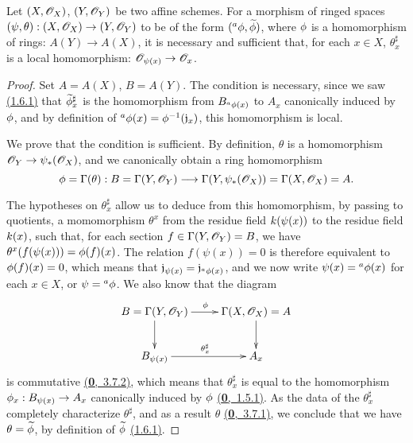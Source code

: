 \begin{thm}[1.7.3]
\label{thm-1.1.7.3}
Let $(X,\mathscr{O}_X)$, $(Y,\mathscr{O}_Y)$ be two affine schemes. For a morphism of ringed spaces
$(\psi,\theta):(X,\mathscr{O}_X)\to(Y,\mathscr{O}_Y)$ to be of the form $({}^a\phi,\widetilde{\phi})$,
where $\phi$ is a homomorphism of rings: $A(Y)\to A(X)$, it is necessary and sufficient
that, for each $x\in X$, $\theta_x^\sharp$ is a local homomorphism: $\mathscr{O}_{\psi(x)}\to\mathscr{O}_x$.
\end{thm}

\begin{proof}
\label{proof-thm-1.1.7.3}
Set $A=A(X)$, $B=A(Y)$. The condition is necessary, since we saw \hyperref[env-1.1.6.1]{(1.6.1)} that
$\widetilde{\phi}_x^\sharp$ is the homomorphism from $B_{{}^a\phi(x)}$ to $A_x$ canonically
induced by $\phi$, and by definition of ${}^a\phi(x)=\phi^{-1}(\mathfrak{j}_x)$, this
homomorphism is local.

We prove that the condition is sufficient. By definition, $\theta$ is a homomorphism
$\mathscr{O}_Y\to\psi_*(\mathscr{O}_X)$, and we canonically obtain a ring homomorphism
\[
  \phi=\Gamma(\theta):B=\Gamma(Y,\mathscr{O}_Y)
  \longrightarrow\Gamma(Y,\psi_*(\mathscr{O}_X))=\Gamma(X,\mathscr{O}_X)=A.
\]

The hypotheses on $\theta_x^\sharp$ allow us to deduce from this homomorphism, by passing to
quotients, a momomorphism $\theta^x$ from the residue field $k(\psi(x))$ to the residue
field $k(x)$, such that, for each section $f\in\Gamma(Y,\mathscr{O}_Y)=B$, we have
$\theta^x(f(\psi(x)))=\phi(f)(x)$. The relation $f(\psi(x))=0$ is therefore equivalent to
$\phi(f)(x)=0$, which means that $\mathfrak{j}_{\psi(x)}=\mathfrak{j}_{{}^a\phi(x)}$, and
we now write $\psi(x)={}^a\phi(x)$ for each $x\in X$, or $\psi={}^a\phi$. We also know that
the diagram
\[
  \xymatrix{
    B=\Gamma(Y,\OO_Y)\ar[r]^\vphi\ar[d] &
    \Gamma(X,\OO_X)=A\ar[d]\\
    B_{\psi(x)}\ar[r]^{\theta_x^\sharp} &
    A_x
  }
\]
is commutative \hyperref[env-0.3.7.2]{(\textbf{0},~3.7.2)}, which means that $\theta_x^\sharp$ is equal to the
homomorphism $\phi_x:B_{\psi(x)}\to A_x$ canonically induced by $\phi$ \hyperref[env-0.1.5.1]{(\textbf{0},~1.5.1)}.
As the data of the $\theta_x^\sharp$ completely characterize $\theta^\sharp$, and as a result
$\theta$ \hyperref[env-0.3.7.1]{(\textbf{0},~3.7.1)}, we conclude that we have $\theta=\widetilde{\phi}$, by
definition of $\widetilde{\phi}$ \hyperref[env-1.1.6.1]{(1.6.1)}.
\end{proof}

